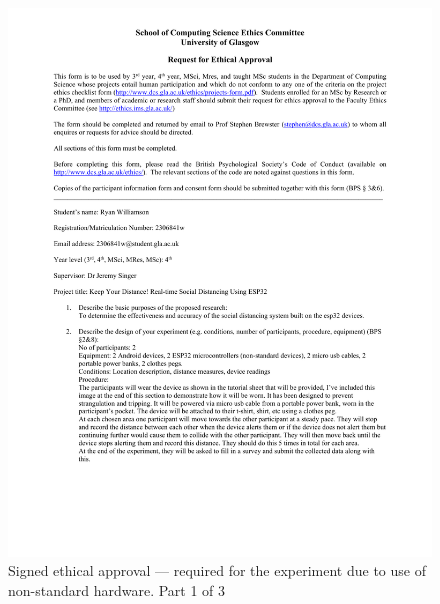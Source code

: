 \documentclass{l4proj}
\begin{document}
\begin{appendices}
    \begin{figure}[!htb]
        \centering
        \includegraphics[width=1.0\linewidth]{images/2306841w-ethics-approval 1.pdf}

        \caption{ Signed ethical approval — required for the experiment due to use of non-standard hardware. Part 1 of 3 }

        \label{fig:full_ethics_approval1}
    \end{figure}


\end{appendices}
\end{document}
